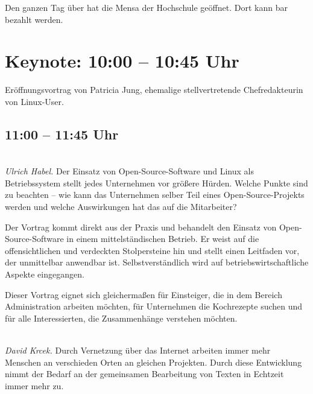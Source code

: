 \documentclass[10pt,a4paper,ngerman,landscape]{scrartcl}
\let\origdescription\description
\renewenvironment{description}{
  \setlength{\leftmargini}{0em}
  \origdescription
  \setlength{\itemindent}{0em}
  \setlength{\itemsep}{1.2em}
  \setlength{\labelsep}{\textwidth}
}
{\endlist}
\newcommand{\vorschub}{\mbox{}\\[-0.5em]}
\begin{document}
Den ganzen Tag über hat
die Mensa der Hochschule geöffnet. Dort kann bar bezahlt werden.

\section{Keynote: 10:00 -- 10:45 Uhr}
Eröffnungsvortrag von Patricia Jung, ehemalige stellvertretende Chefredakteurin
von Linux-User.

\newpage

\setlength{\columnsep}{10.5mm}
\begin{multicols}{3}



\subsection{11:00 -- 11:45 Uhr}
\begin{description}
\item[Open Source in Unternehmen]\vorschub
\textsl{Ulrich Habel.}
Der Einsatz von Open-Source-Software und Linux als Betriebssystem stellt jedes
Unternehmen vor größere Hürden. Welche Punkte sind zu beachten -- wie kann das
Unternehmen selber Teil eines Open-Source-Projekts werden und welche
Auswirkungen hat das auf die Mitarbeiter?

Der Vortrag kommt direkt aus der Praxis und behandelt den Einsatz von
Open-Source-Software in einem mittelständischen Betrieb. Er weist auf die
offensichtlichen und verdeckten Stolpersteine hin und stellt einen Leitfaden
vor, der unmittelbar anwendbar ist. Selbstverständlich wird auf
betriebswirtschaftliche Aspekte eingegangen.

Dieser Vortrag eignet sich gleichermaßen für Einsteiger, die in dem Bereich
Administration arbeiten möchten, für Unternehmen die Kochrezepte suchen und für
alle Interessierten, die Zusammenhänge verstehen möchten.



\item[Kollaboration mit Etherpad]\vorschub
\textsl{David Krcek.}
Durch Vernetzung über das Internet arbeiten immer mehr Menschen an verschieden
Orten an gleichen Projekten. Durch diese Entwicklung nimmt der Bedarf an der
gemeinsamen Bearbeitung von Texten in Echtzeit immer mehr zu.


\end{description}
\end{multicols}
\end{document}
